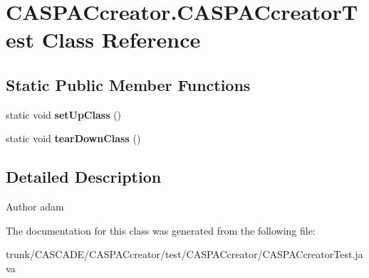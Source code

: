 \hypertarget{classCASPACcreator_1_1CASPACcreatorTest}{\section{C\-A\-S\-P\-A\-Ccreator.\-C\-A\-S\-P\-A\-Ccreator\-Test Class Reference}
\label{classCASPACcreator_1_1CASPACcreatorTest}
}
\subsection*{Static Public Member Functions}
\begin{DoxyCompactItemize}
\item 
\hypertarget{classCASPACcreator_1_1CASPACcreatorTest_a3ab0f82df4a9652e33a691427c2a75e7}{static void {\bfseries set\-Up\-Class} ()}\label{classCASPACcreator_1_1CASPACcreatorTest_a3ab0f82df4a9652e33a691427c2a75e7}

\item 
\hypertarget{classCASPACcreator_1_1CASPACcreatorTest_ac5ba5a6d730573f06968ae443f82fded}{static void {\bfseries tear\-Down\-Class} ()}\label{classCASPACcreator_1_1CASPACcreatorTest_ac5ba5a6d730573f06968ae443f82fded}

\end{DoxyCompactItemize}


\subsection{Detailed Description}
\begin{DoxyAuthor}{Author}
adam 
\end{DoxyAuthor}


The documentation for this class was generated from the following file\-:\begin{DoxyCompactItemize}
\item 
trunk/\-C\-A\-S\-C\-A\-D\-E/\-C\-A\-S\-P\-A\-Ccreator/test/\-C\-A\-S\-P\-A\-Ccreator/C\-A\-S\-P\-A\-Ccreator\-Test.\-java\end{DoxyCompactItemize}
